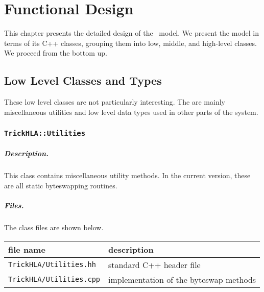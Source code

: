 %
%
%
\chapter{Functional Design}\label{sec:functional_design}

This chapter presents the detailed design of the \TrickHLA\ model.
We present the model in terms of its C++ classes,
grouping them into low, middle, and high-level classes.
We proceed from the bottom up.

\section{Low Level Classes and Types}

These low level classes are not particularly interesting.
The are mainly miscellaneous utilities and low level data types
used in other parts of the system.

\subsection{{\tt TrickHLA::Utilities}}

\paragraph{Description.}
This class contains miscellaneous utility methods.
In the current version, these are all static byteswapping routines.

\paragraph{Files.}
The class files are shown below.
   
{
  \scriptsize
  \begin{tabular}{|l|l|} 
    \hline
    file name & description \\
    \hline \hline
    {\tt TrickHLA/Utilities.hh} 
    & standard C++ header file
    \\ \hline
    {\tt TrickHLA/Utilities.cpp} 
    & implementation of the byteswap methods
    \\ \hline
  \end{tabular}
}

